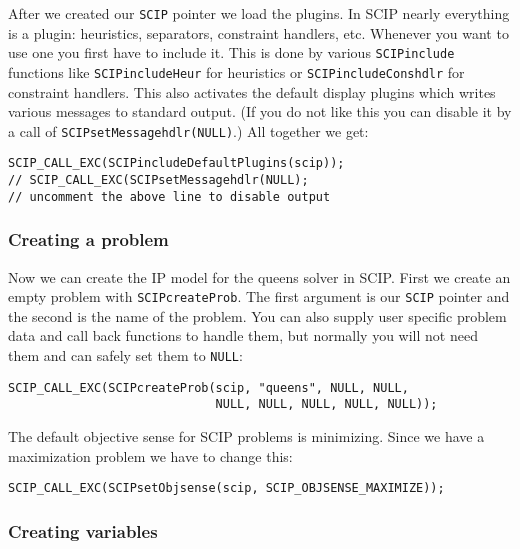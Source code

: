 \documentclass[a4paper]{article}
\begin{document}
After we created our \verb+SCIP+ pointer we load the plugins. In SCIP nearly everything is a plugin: 
heuristics, separators, constraint handlers, etc. Whenever you want to use one you first have to include 
it. This is done by various \verb+SCIPinclude+ functions like \verb+SCIPincludeHeur+ for heuristics 
or \verb+SCIPincludeConshdlr+ for constraint handlers. This also activates the default display plugins 
which writes various messages to standard output. (If you do not like this you can disable it by a call of 
\verb+SCIPsetMessagehdlr(NULL)+.) All together we get:
\begin{verbatim}
SCIP_CALL_EXC(SCIPincludeDefaultPlugins(scip));
// SCIP_CALL_EXC(SCIPsetMessagehdlr(NULL);
// uncomment the above line to disable output
\end{verbatim}

\subsubsection{Creating a problem}

Now we can create the IP model for the queens solver in SCIP. First we create an empty problem with
\verb+SCIPcreateProb+. The first argument is our \verb+SCIP+ pointer and the second is the name 
of the problem. You can also supply user specific problem data and call back functions to handle them, 
but normally you will not need them and can safely set them to \verb+NULL+:
\begin{verbatim}
SCIP_CALL_EXC(SCIPcreateProb(scip, "queens", NULL, NULL,
                             NULL, NULL, NULL, NULL, NULL));
\end{verbatim}
The default objective sense for SCIP problems is minimizing. Since we have a maximization problem we have to change this:
\begin{verbatim}
SCIP_CALL_EXC(SCIPsetObjsense(scip, SCIP_OBJSENSE_MAXIMIZE));
\end{verbatim}


\subsubsection{Creating variables}
\end{document}
